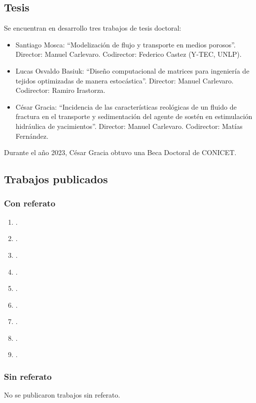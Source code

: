 \documentclass[a4paper,11pt,twoside,final,titlepage,onecolumn,openright]{report}
\begin{document}
\subsection{Tesis}

Se encuentran en desarrollo tres trabajos de tesis doctoral:
\begin{itemize}
 \item Santiago Mosca: ``Modelización de flujo y transporte en medios porosos''. Director: Manuel Carlevaro. Codirector: Federico Castez (Y-TEC, UNLP).
 \item Lucas Osvaldo Basiuk: ``Diseño computacional de matrices para ingeniería de tejidos optimizadas de manera estocástica''. Director: Manuel Carlevaro. Codirector: Ramiro Irastorza.
\item César Gracia: ``Incidencia de las características reológicas de un fluido de fractura en el transporte y sedimentación del agente de sostén en estimulación hidráulica de yacimientos''. Director: Manuel Carlevaro. Codirector: Matías Fernández.
\end{itemize}

Durante el año 2023, César Gracia obtuvo una Beca Doctoral de CONICET.

\subsection{Trabajos publicados}

\subsubsection{Con referato}

\begin{enumerate}
    \item {}.
    \item {}.
    \item {}.
    \item {}.
    \item {}.
    \item {}.
    \item {}.
    \item {}.
    \item {}.
\end{enumerate}

\subsubsection{Sin referato}
No se publicaron trabajos sin referato.
\end{document}
